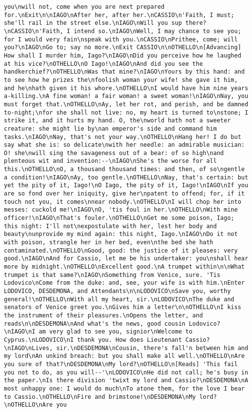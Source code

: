 \begin{verbatim}
you\nwill not, come when you are next prepared for.\nExit\n\nIAGO\nAfter her, after her.\nCASSIO\n'Faith, I must; she'll rail in the street else.\nIAGO\nWill you sup there?\nCASSIO\n'Faith, I intend so.\nIAGO\nWell, I may chance to see you; for I would very fain\nspeak with you.\nCASSIO\nPrithee, come; will you?\nIAGO\nGo to; say no more.\nExit CASSIO\n\nOTHELLO\n[Advancing] How shall I murder him, Iago?\nIAGO\nDid you perceive how he laughed at his vice?\nOTHELLO\nO Iago!\nIAGO\nAnd did you see the handkerchief?\nOTHELLO\nWas that mine?\nIAGO\nYours by this hand: and to see how he prizes the\nfoolish woman your wife! she gave it him, and he\nhath given it his whore.\nOTHELLO\nI would have him nine years a-killing.\nA fine woman! a fair woman! a sweet woman!\nIAGO\nNay, you must forget that.\nOTHELLO\nAy, let her rot, and perish, and be damned to-night;\nfor she shall not live: no, my heart is turned to\nstone; I strike it, and it hurts my hand. O, the\nworld hath not a sweeter creature: she might lie by\nan emperor's side and command him tasks.\nIAGO\nNay, that's not your way.\nOTHELLO\nHang her! I do but say what she is: so delicate\nwith her needle: an admirable musician: O! she\nwill sing the savageness out of a bear: of so high\nand plenteous wit and invention:--\nIAGO\nShe's the worse for all this.\nOTHELLO\nO, a thousand thousand times: and then, of so\ngentle a condition!\nIAGO\nAy, too gentle.\nOTHELLO\nNay, that's certain: but yet the pity of it, Iago!\nO Iago, the pity of it, Iago!\nIAGO\nIf you are so fond over her iniquity, give her\npatent to offend; for, if it touch not you, it comes\nnear nobody.\nOTHELLO\nI will chop her into messes: cuckold me!\nIAGO\nO, 'tis foul in her.\nOTHELLO\nWith mine officer!\nIAGO\nThat's fouler.\nOTHELLO\nGet me some poison, Iago; this night: I'll not\nexpostulate with her, lest her body and beauty\nunprovide my mind again: this night, Iago.\nIAGO\nDo it not with poison, strangle her in her bed, even\nthe bed she hath contaminated.\nOTHELLO\nGood, good: the justice of it pleases: very good.\nIAGO\nAnd for Cassio, let me be his undertaker: you\nshall hear more by midnight.\nOTHELLO\nExcellent good.\nA trumpet within\n\nWhat trumpet is that same?\nIAGO\nSomething from Venice, sure. 'Tis Lodovico\nCome from the duke: and, see, your wife is with him.\nEnter LODOVICO, DESDEMONA, and Attendants\n\nLODOVICO\nSave you, worthy general!\nOTHELLO\nWith all my heart, sir.\nLODOVICO\nThe duke and senators of Venice greet you.\nGives him a letter\n\nOTHELLO\nI kiss the instrument of their pleasures.\nOpens the letter, and reads\n\nDESDEMONA\nAnd what's the news, good cousin Lodovico?\nIAGO\nI am very glad to see you, signior\nWelcome to Cyprus.\nLODOVICO\nI thank you. How does Lieutenant Cassio?\nIAGO\nLives, sir.\nDESDEMONA\nCousin, there's fall'n between him and my lord\nAn unkind breach: but you shall make all well.\nOTHELLO\nAre you sure of that?\nDESDEMONA\nMy lord?\nOTHELLO\n[Reads] 'This fail you not to do, as you will--'\nLODOVICO\nHe did not call; he's busy in the paper.\nIs there division 'twixt my lord and Cassio?\nDESDEMONA\nA most unhappy one: I would do much\nTo atone them, for the love I bear to Cassio.\nOTHELLO\nFire and brimstone!\nDESDEMONA\nMy lord?\nOTHELLO\nAre you 
\end{verbatim}
